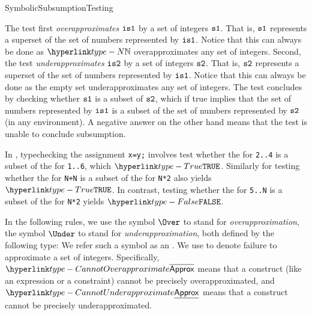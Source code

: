 \begin{TypingRuleList}{SymbolicSubsumptionTesting}

The test first \emph{overapproximates} $\texttt{is1}$ by a set of integers $\texttt{s1}$.
That is, $\texttt{s1}$ represents a superset of the set of numbers represented by $\texttt{is1}$.
Notice that this can always be done as $\N$ overapproximates any set of integers.
%
Second, the test \emph{underapproximates} $\texttt{is2}$ by a set of integers $\texttt{s2}$.
That is, $\texttt{s2}$ represents a superset of the set of numbers represented by $\texttt{is1}$.
Notice that this can always be done as the empty set underapproximates any set of integers.
%
The test concludes by checking whether $\texttt{s1}$ is a subset of $\texttt{s2}$,
which if true implies that the set of numbers represented by $\texttt{is1}$ is a subset of the
set of numbers represented by $\texttt{s2}$ (in any environment).
A negative answer on the other hand means that the
test is unable to conclude subsumption.

In , typechecking the assignment \verb|x=y;|
involves test whether the \symbolicdomainterm{} for \verb|2..4| is a subset of the
\symbolicdomainterm{} for \verb|1..6|, which $\True$.
Similarly for testing whether the \symbolicdomainterm{} for \verb|N+N|
is a subset of the \symbolicdomainterm{} for \verb|N*2| also yields $\True$.
In contrast, testing whether the \symbolicdomainterm{} for \verb|5..N|
is a subset of the \symbolicdomainterm{} for \verb|N*2| yields $\False$.

\hypertarget{def-approximationdirectionterm}{}
In the following rules, we use the symbol $\Over$ to stand for \emph{overapproximation},
the symbol $\Under$ to stand for \emph{underapproximation},
both defined by the following type: 
We refer such a symbol as an \approximationdirectionterm.
We use  to denote failure to approximate a set of integers.
Specifically, $\CannotOverapproximate$ means that a construct
(like an expression or a constraint) cannot be precisely overapproximated,
and $\CannotUnderapproximate$ means that a construct cannot be precisely
underapproximated.





\end{TypingRuleList}
